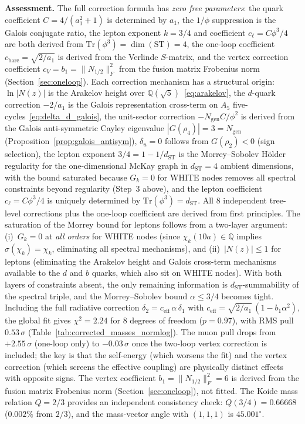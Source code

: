 \documentclass[12pt,a4paper]{article}
\theoremstyle{definition}
\begin{document}
\textbf{Assessment.} The full correction formula has \emph{zero free parameters}: the quark coefficient $C = 4/(a_1^2+1)$ is determined by $a_1$, the $1/\phi$ suppression is the Galois conjugate ratio, the lepton exponent $k = 3/4$ and coefficient $c_\ell = C\phi^3/4$ are both derived from $\mathrm{Tr}(\phi^3) = \dim(\mathrm{ST}) = 4$, the one-loop coefficient $c_{\mathrm{bare}} = \sqrt{2/a_1}$ is derived from the Verlinde $S$-matrix, and the vertex correction coefficient $c_V = b_1 = \|N_{1/2}\|_F^2$ from the fusion matrix Frobenius norm (Section~\ref{sec:oneloop}).  Each correction mechanism has a structural origin: $\ln|N(z)|$ is the Arakelov height over $\mathbb{Q}(\sqrt{5})$~\eqref{eq:arakelov}, the $d$-quark correction $-2/a_1$ is the Galois representation cross-term on $A_5$ five-cycles~\eqref{eq:delta_d_galois}, the unit-sector correction $-N_{\text{gen}} C/\phi^2$ is derived from the Galois anti-symmetric Cayley eigenvalue $|G(\rho_4)| = 3 = N_{\text{gen}}$ (Proposition~\ref{prop:galois_antisym}), $\delta_u = 0$ follows from $G(\rho_2) < 0$ (sign selection), the lepton exponent $3/4 = 1 - 1/d_{\text{ST}}$ is the Morrey--Sobolev H\"{o}lder regularity for the one-dimensional McKay graph in $d_{\text{ST}} = 4$ ambient dimensions, with the bound saturated because $G_k = 0$ for WHITE nodes removes all spectral constraints beyond regularity (Step~3 above), and the lepton coefficient $c_\ell = C\phi^3/4$ is uniquely determined by $\mathrm{Tr}(\phi^3) = d_{\text{ST}}$.  All 8 independent tree-level corrections plus the one-loop coefficient are derived from first principles.  The saturation of the Morrey bound for leptons follows from a two-layer argument: (i)~$G_k = 0$ at \emph{all orders} for WHITE nodes (since $\chi_k(10a) \in \mathbb{Q}$ implies $\sigma(\chi_k) = \chi_k$, eliminating all spectral mechanisms), and (ii)~$|N(z)| \leq 1$ for leptons (eliminating the Arakelov height and Galois cross-term mechanisms available to the $d$ and $b$ quarks, which also sit on WHITE nodes).  With both layers of constraints absent, the only remaining information is $d_{\text{ST}}$-summability of the spectral triple, and the Morrey--Sobolev bound $\alpha \leq 3/4$ becomes tight.  Including the full radiative correction $\delta_2 = c_{\mathrm{eff}}\,\alpha\,\delta_1$ with $c_{\mathrm{eff}} = \sqrt{2/a_1}\,(1 - b_1\alpha^2)$, the global fit gives $\chi^2 = 2.24$ for $8$ degrees of freedom ($p = 0.97$), with RMS pull $0.53\,\sigma$ (Table~\ref{tab:corrected_masses_normlog}).  The muon pull drops from $+2.55\,\sigma$ (one-loop only) to $-0.03\,\sigma$ once the two-loop vertex correction is included; the key is that the self-energy (which worsens the fit) and the vertex correction (which screens the effective coupling) are physically distinct effects with opposite signs.  The vertex coefficient $b_1 = \|N_{1/2}\|_F^2 = 6$ is derived from the fusion matrix Frobenius norm (Section~\ref{sec:oneloop}), not fitted.  The Koide mass relation $Q = 2/3$ provides an independent consistency check: $Q(3/4) = 0.66668$ ($0.002\%$ from $2/3$), and the mass-vector angle with $(1,1,1)$ is $45.001^\circ$.
\end{document}
